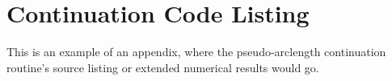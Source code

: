 \chapter{Continuation Code Listing}

This is an example of an appendix, where the pseudo-arclength
continuation routine's source listing or extended numerical results
would go.
